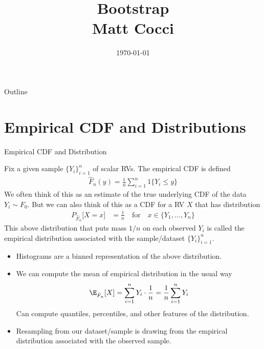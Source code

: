 \documentclass[aspectratio=169, handout]{beamer}
\title[]{Bootstrap \\ Matt Cocci}
\author[]{}
\date{\today}
\begin{document}
\begin{frame}[plain]
\titlepage
\end{frame}


\begin{frame}{Outline}
\tableofcontents[hideallsubsections]
\end{frame}




\section{Empirical CDF and Distributions}


{\scriptsize
\begin{frame}{Empirical CDF and Distribution}

Fix a given sample $\{Y_i\}_{i=1}^n$ of scalar RVs.
The \alert{empirical CDF} is defined
\begin{align*}
  \hat{F}_n(y)
  =
  \frac{1}{n}
  \sum_{i=1}^n
  {1}\{Y_i \leq y\}
\end{align*}
We often think of this as an estimate of the true underlying CDF of the
data $Y_i\sim F_0$.
But we can also think of this as a CDF for a RV $X$ that has
distribution
\begin{align*}
  P_{\hat{F}_n}\big[
    X = x
  \big]
  &=
  \frac{1}{n}
  \quad\text{for}\quad
  x\in\{Y_1,\ldots,Y_n\}
\end{align*}
This above distribution that puts mass $1/n$ on each observed $Y_i$ is
called the \alert{empirical distribution} associated with the
sample/dataset $\{Y_i\}_{i=1}^n$.
\begin{itemize}
  \item Histograms are a binned representation of the above
    distribution.
  \item
    We can compute the \alert{mean} of empirical distribution in the
    usual way
    \begin{align*}
      \E_{\hat{F}_n}[X]
      =
      \sum_{i=1}^n
      Y_i \cdot \frac{1}{n}
      =
      \frac{1}{n}
      \sum_{i=1}^n
      Y_i
    \end{align*}
    Can compute \alert{quantiles}, \alert{percentiles}, and other
    features of the distribution.

  \item \alert{Resampling} from our dataset/sample is drawing from the
    empirical distribution associated with the observed sample.
\end{itemize}

\end{frame}
}
\end{document}
